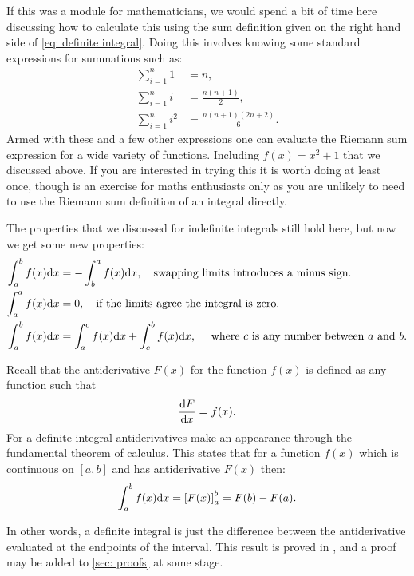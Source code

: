 \begin{mdiv}
If this was a module for mathematicians, we would spend a bit of time here discussing how to calculate this using the sum definition given on the right hand side of \cref{eq: definite integral}.  Doing this involves knowing some standard expressions for summations such as:
\begin{align*}
\sum_{i=1}^{n}1&=n,\\
\sum_{i=1}^{n}i&=\frac{n(n+1)}{2},\\
\sum_{i=1}^{n}i^{2}&=\frac{n(n+1)(2n+2)}{6}.
\end{align*}
Armed with these and a few other expressions one can evaluate the Riemann sum expression for a wide variety of functions. Including $f(x)=x^{2}+1$ that we discussed above. If you are interested in trying this it is worth doing at least once, though is an exercise for maths enthusiasts only as you are unlikely to need to use the Riemann sum definition of an integral directly.
\end{mdiv}

The properties that we discussed for indefinite integrals still hold here, but now we get some new properties:
\begin{align*}
\int_{a}^{b}f(x)\mathrm{d} x&=-\int_{b}^{a}f(x)\mathrm{d} x, \quad \text{swapping limits introduces a minus sign.}\\
\int_{a}^{a}f(x)\mathrm{d} x&=0, \quad \text{if the limits agree the integral is zero.}\\
\int_{a}^{b}f(x)\mathrm{d} x &=\int_{a}^{c}f(x)\mathrm{d} x +\int_{c}^{b}f(x)\mathrm{d} x, \quad \text{ where $c$ is any number between $a$ and $b$.}
\end{align*}

Recall that the antiderivative $F(x)$ for the function $f(x)$ is defined as any function such that
\begin{equation*}
\frac{\mathrm{d} F}{\mathrm{d} x}=f(x).
\end{equation*}
For a definite integral  antiderivatives make an appearance through the fundamental theorem of calculus. This states that for a function $f(x)$ which is continuous on $[a,b]$ and has antiderivative $F(x)$ then:
\begin{equation}
\int_{a}^{b}f(x)\mathrm{d} x=\left[F(x)\right]_{a}^{b}=F(b)-F(a).
\label{eq: ftc I}
\end{equation}

In other words, a definite integral is just the difference between the antiderivative evaluated at the endpoints of the interval. This result is proved in \cite{calcI}, and a proof may be added to \cref{sec: proofs} at some stage.

